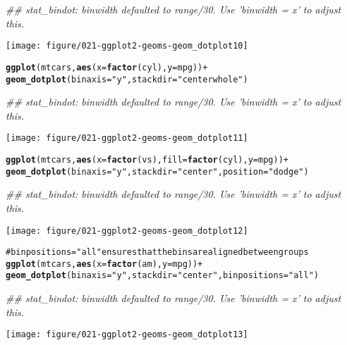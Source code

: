 \documentclass[a4paper,titlepage]{tufte-handout}\usepackage{graphicx, color}
\makeatletter
\def\maxwidth{ %
  \ifdim\Gin@nat@width>\linewidth
    \linewidth
  \else
    \Gin@nat@width
  \fi
}
\newcommand{\hlfunctioncall}[1]{\textcolor[rgb]{0.501960784313725,0,0.329411764705882}{\textbf{#1}}}%
\newcommand{\hlstring}[1]{\textcolor[rgb]{0.6,0.6,1}{#1}}%
\newcommand{\hlcomment}[1]{\textcolor[rgb]{0.180392156862745,0.6,0.341176470588235}{#1}}%
\newenvironment{kframe}{%
 \def\at@end@of@kframe{}%
 \ifinner\ifhmode%
  \def\at@end@of@kframe{\end{minipage}}%
  \begin{minipage}{\columnwidth}%
 \fi\fi%
 \def\FrameCommand##1{\hskip\@totalleftmargin \hskip-\fboxsep
 \colorbox{shadecolor}{##1}\hskip-\fboxsep
     \hskip-\linewidth \hskip-\@totalleftmargin \hskip\columnwidth}%
 \MakeFramed {\advance\hsize-\width
   \@totalleftmargin\z@ \linewidth\hsize
   \@setminipage}}%
 {\par\unskip\endMakeFramed%
 \at@end@of@kframe}
\newenvironment{knitrout}{}{} %
\makeatother
\begin{document}
\begin{knitrout}
\begin{kframe}
{\ttfamily\noindent\itshape\textcolor{messagecolor}{\#\# stat\_bindot: binwidth defaulted to range/30. Use 'binwidth = x' to adjust this.}}\end{kframe}
\texttt{[image: figure/021-ggplot2-geoms-geom\_dotplot10]} 
\begin{kframe}\begin{alltt}

\hlfunctioncall{ggplot}(mtcars, \hlfunctioncall{aes}(x = \hlfunctioncall{factor}(cyl), y = mpg)) +
  \hlfunctioncall{geom_dotplot}(binaxis = \hlstring{"y"}, stackdir = \hlstring{"centerwhole"})
\end{alltt}


{\ttfamily\noindent\itshape\textcolor{messagecolor}{\#\# stat\_bindot: binwidth defaulted to range/30. Use 'binwidth = x' to adjust this.}}\end{kframe}
\texttt{[image: figure/021-ggplot2-geoms-geom\_dotplot11]} 
\begin{kframe}\begin{alltt}

\hlfunctioncall{ggplot}(mtcars, \hlfunctioncall{aes}(x = \hlfunctioncall{factor}(vs), fill = \hlfunctioncall{factor}(cyl), y = mpg)) +
  \hlfunctioncall{geom_dotplot}(binaxis = \hlstring{"y"}, stackdir = \hlstring{"center"}, position = \hlstring{"dodge"})
\end{alltt}


{\ttfamily\noindent\itshape\textcolor{messagecolor}{\#\# stat\_bindot: binwidth defaulted to range/30. Use 'binwidth = x' to adjust this.}}\end{kframe}
\texttt{[image: figure/021-ggplot2-geoms-geom\_dotplot12]} 
\begin{kframe}\begin{alltt}

\hlcomment{# binpositions="all" ensures that the bins are aligned between groups}
\hlfunctioncall{ggplot}(mtcars, \hlfunctioncall{aes}(x = \hlfunctioncall{factor}(am), y = mpg)) +
  \hlfunctioncall{geom_dotplot}(binaxis = \hlstring{"y"}, stackdir = \hlstring{"center"}, binpositions=\hlstring{"all"})
\end{alltt}


{\ttfamily\noindent\itshape\textcolor{messagecolor}{\#\# stat\_bindot: binwidth defaulted to range/30. Use 'binwidth = x' to adjust this.}}\end{kframe}
\texttt{[image: figure/021-ggplot2-geoms-geom\_dotplot13]} 
\begin{kframe}\begin{alltt}


\end{alltt}
\end{kframe}
\end{knitrout}
\end{document}
